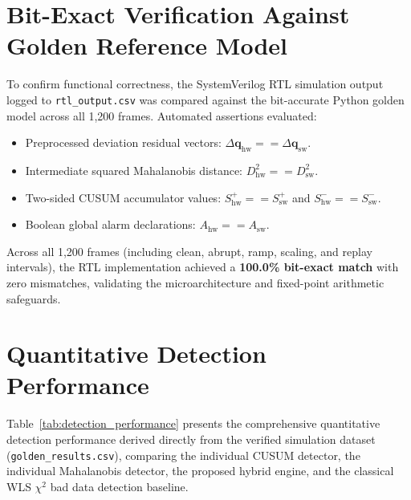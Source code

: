 \documentclass[11pt,a4paper]{report}
\begin{document}
\section{Bit-Exact Verification Against Golden Reference Model}
To confirm functional correctness, the SystemVerilog RTL simulation output logged to
\texttt{rtl\_output.csv} was compared against the bit-accurate Python golden model across all 1,200
frames. Automated assertions evaluated:
\begin{itemize}
    \item Preprocessed deviation residual vectors: $\Delta\boldsymbol{q}_{\text{hw}} == \Delta\boldsymbol{q}_{\text{sw}}$.
    \item Intermediate squared Mahalanobis distance: $D^2_{\text{hw}} == D^2_{\text{sw}}$.
    \item Two-sided CUSUM accumulator values: $S^+_{\text{hw}} == S^+_{\text{sw}}$ and $S^-_{\text{hw}} == S^-_{\text{sw}}$.
    \item Boolean global alarm declarations: $A_{\text{hw}} == A_{\text{sw}}$.
\end{itemize}
Across all 1,200 frames (including clean, abrupt, ramp, scaling, and replay intervals),
the RTL implementation achieved a \textbf{100.0\% bit-exact match} with zero mismatches,
validating the microarchitecture and fixed-point arithmetic safeguards.

\section{Quantitative Detection Performance}
Table~\ref{tab:detection_performance} presents the comprehensive quantitative detection
performance derived directly from the verified simulation dataset (\texttt{golden\_results.csv}),
comparing the individual CUSUM detector, the individual Mahalanobis detector, the proposed
hybrid engine, and the classical WLS $\chi^2$ bad data detection baseline.
\end{document}
